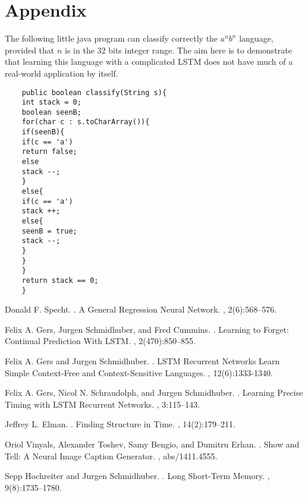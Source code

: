 \documentclass[11pt,letterpaper]{article}
\begin{document}
	\section{Appendix}
	The following little java program can classify correctly the $a^nb^n$ language, provided that $n$ is in the 32 bits integer range. The aim here is to demonstrate that learning this language with a complicated LSTM does not have much of a real-world application by itself.

	\begin{verbatim}
	public boolean classify(String s){
	int stack = 0;
	boolean seenB;
	for(char c : s.toCharArray()){
	if(seenB){
	if(c == 'a')
	return false;
	else
	stack --;
	}
	else{
	if(c == 'a')
	stack ++;
	else{
	seenB = true;
	stack --;
	}
	}
	}
	return stack == 0;
	}
	\end{verbatim}


	\begin{thebibliography}{}

		Donald F. Specht.
		.
		\newblock A General Regression Neural Network.
		,
		2(6):568--576.

		Felix A. Gers,  Jurgen Schmidhuber, and Fred Cummins.
		.
		\newblock Learning to Forget: Continual Prediction With LSTM.
		,
		2(470):850--855.

		Felix A. Gers and Jurgen Schmidhuber.
		.
		\newblock LSTM Recurrent Networks Learn Simple Context-Free and Context-Sensitive Languages.
		,
		12(6):1333-1340.

		Felix A. Gers, Nicol N. Schraudolph, and Jurgen Schmidhuber.
		.
		\newblock Learning Precise Timing with LSTM Recurrent Networks.
		,
		3:115--143.

		Jeffrey L. Elman.
		.
		\newblock Finding Structure in Time.
		,
		14(2):179--211.

		Oriol Vinyals, Alexander Toshev, Samy Bengio, and Dumitru Erhan.
		.
		\newblock Show and Tell: A Neural Image Caption Generator.
		,
		abs/1411.4555.

		Sepp Hochreiter and Jurgen Schmidhuber.
		.
		\newblock Long Short-Term Memory.
		,
		9(8):1735--1780.

	\end{thebibliography}
\end{document}
